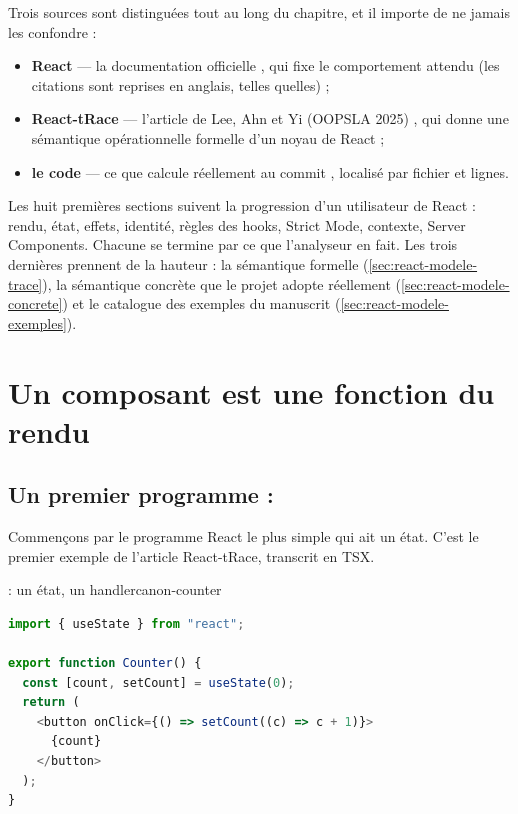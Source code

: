 Trois sources sont distinguées tout au long du chapitre, et il importe de ne
jamais les confondre :
\begin{itemize}
  \item \textbf{React} --- la documentation officielle \cite{ReactDocs}, qui fixe
    le comportement attendu (les citations sont reprises en anglais, telles
    quelles) ;
  \item \textbf{React-tRace} --- l'article de Lee, Ahn et Yi (OOPSLA 2025)
    \cite{LeeAhnYi2025}, qui donne une sémantique opérationnelle formelle d'un
    noyau de React ;
  \item \textbf{le code} --- ce que \reactant{} calcule réellement au commit
    , localisé par fichier et lignes.
\end{itemize}
Les huit premières sections suivent la progression d'un utilisateur de React :
rendu, état, effets, identité, règles des hooks, Strict Mode, contexte, Server
Components. Chacune se termine par ce que l'analyseur en fait. Les trois
dernières prennent de la hauteur : la sémantique formelle
(\cref{sec:react-modele-trace}), la sémantique concrète que le projet adopte
réellement (\cref{sec:react-modele-concrete}) et le catalogue des exemples du
manuscrit (\cref{sec:react-modele-exemples}).

\section{Un composant est une fonction du rendu}
\label{sec:react-modele-rendu}

\subsection{Un premier programme : }

Commençons par le programme React le plus simple qui ait un état. C'est le
premier exemple de l'article React-tRace, transcrit en TSX.

\begin{exemple}{ : un état, un handler}{canon-counter}
\begin{lstlisting}[language=TypeScript,caption={\code{Counter} (fichier \file{/tmp/ch02/counter.tsx})},label={lst:react-modele-counter}]
import { useState } from "react";

export function Counter() {
  const [count, setCount] = useState(0);
  return (
    <button onClick={() => setCount((c) => c + 1)}>
      {count}
    </button>
  );
}
\end{lstlisting}
\end{exemple}

